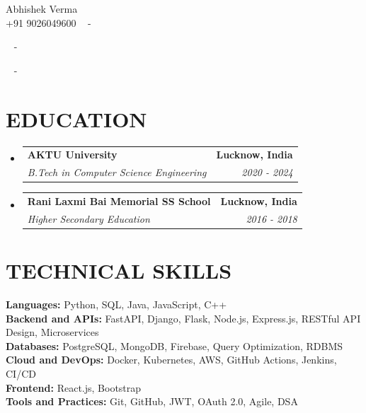 \documentclass[letterpaper,11pt]{article}
\makeatletter
\newcommand{\resumeSubheading}[4]{\vspace{-2pt}\item\begin{tabular*}{1.0\textwidth}[t]{l@{\extracolsep{\fill}}r}\textbf{\large#1} & \textbf{\small #2} \\\textit{\large#3} & \textit{\small #4} \\\end{tabular*}\vspace{-7pt}}
\newcommand{\resumeSubHeadingListStart}{\begin{itemize}[leftmargin=0.0in, label={}]}
\newcommand{\resumeSubHeadingListEnd}{\end{itemize}}
\makeatother
\begin{document}
\begin{center}
    {\huge Abhishek Verma} \\ \vspace{2pt} 
    {+91 9026049600} ~ \small{-}
    \href{mailto:abhishek1pw@gmail.com}{\color{blue}{abhishek1pw@gmail.com}}
    
    ~ \small{-} \href{https://linkedin.com/in/abhishek-verma-profile}{\color{blue}{linkedin.com/in/abhishek-verma-profile}} 
    
    
    ~ \small{-} \href{https://github.com/abhishek-verma-github}{\color{blue}{github.com/abhishek-verma-github}}
    
\end{center}

\section{\color{airforceblue}EDUCATION}
  \resumeSubHeadingListStart
    
    \resumeSubheading{AKTU University}{Lucknow, India}{B.Tech in Computer Science Engineering}{2020 - 2024}
    
    \resumeSubheading{Rani Laxmi Bai Memorial SS School}{Lucknow, India}{Higher Secondary Education}{2016 - 2018}
    
  \resumeSubHeadingListEnd

\section{\color{airforceblue}TECHNICAL SKILLS}
 \begin{itemize}[leftmargin=0in, label={}]
    \small{\item{
     
     \textbf{\normalsize{Languages:}}{ \normalsize{Python, SQL, Java, JavaScript, C++}} \\
     
     \textbf{\normalsize{Backend and APIs:}}{ \normalsize{FastAPI, Django, Flask, Node.js, Express.js, RESTful API Design, Microservices}} \\
     
     \textbf{\normalsize{Databases:}}{ \normalsize{PostgreSQL, MongoDB, Firebase, Query Optimization, RDBMS}} \\
     
     \textbf{\normalsize{Cloud and DevOps:}}{ \normalsize{Docker, Kubernetes, AWS, GitHub Actions, Jenkins, CI/CD}} \\
     
     \textbf{\normalsize{Frontend:}}{ \normalsize{React.js, Bootstrap}} \\
     
     \textbf{\normalsize{Tools and Practices:}}{ \normalsize{Git, GitHub, JWT, OAuth 2.0, Agile, DSA}} \\
     
     }}
 \end{itemize}
 
\end{document}
